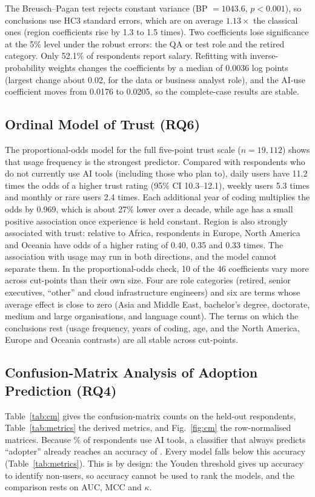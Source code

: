 \documentclass[conference]{IEEEtran}
\begin{document}
The Breusch--Pagan test rejects constant variance (BP $=1043.6$, $p<0.001$), so conclusions use HC3 standard errors, which are on average $1.13\times$ the classical ones (region coefficients rise by 1.3 to 1.5 times). Two coefficients lose significance at the 5\% level under the robust errors: the QA or test role and the retired category. Only 52.1\% of respondents report salary. Refitting with inverse-probability weights changes the coefficients by a median of 0.0036 log points (largest change about 0.02, for the data or business analyst role), and the AI-use coefficient moves from 0.0176 to 0.0205, so the complete-case results are stable.

\subsection{Ordinal Model of Trust (RQ6)}
The proportional-odds model for the full five-point trust scale ($n=19{,}112$) shows that usage frequency is the strongest predictor. Compared with respondents who do not currently use AI tools (including those who plan to), daily users have 11.2 times the odds of a higher trust rating (95\% CI 10.3--12.1), weekly users 5.3 times and monthly or rare users 2.4 times. Each additional year of coding multiplies the odds by 0.969, which is about 27\% lower over a decade, while age has a small positive association once experience is held constant. Region is also strongly associated with trust: relative to Africa, respondents in Europe, North America and Oceania have odds of a higher rating of 0.40, 0.35 and 0.33 times. The association with usage may run in both directions, and the model cannot separate them. In the proportional-odds check, 10 of the 46 coefficients vary more across cut-points than their own size. Four are role categories (retired, senior executives, ``other'' and cloud infrastructure engineers) and six are terms whose average effect is close to zero (Asia and Middle East, bachelor's degree, doctorate, medium and large organisations, and language count). The terms on which the conclusions rest (usage frequency, years of coding, age, and the North America, Europe and Oceania contrasts) are all stable across cut-points.

\subsection{Confusion-Matrix Analysis of Adoption Prediction (RQ4)}
Table~\ref{tab:cm} gives the confusion-matrix counts on the \nTest{} held-out respondents, Table~\ref{tab:metrics} the derived metrics, and Fig.~\ref{fig:cm} the row-normalised matrices. Because \posShare\% of respondents use AI tools, a classifier that always predicts ``adopter'' already reaches an accuracy of \baselineAcc. Every model falls below this accuracy (Table~\ref{tab:metrics}). This is by design: the Youden threshold gives up accuracy to identify non-users, so accuracy cannot be used to rank the models, and the comparison rests on AUC, MCC and $\kappa$.
\end{document}
